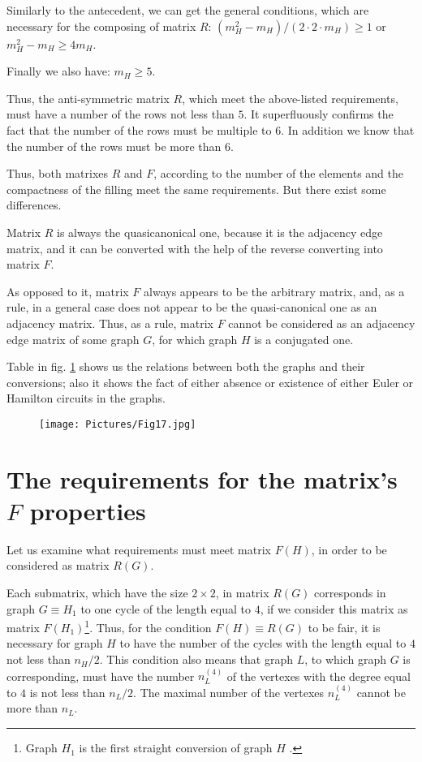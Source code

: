 \documentclass{amsart}
\theoremstyle{plain}
\numberwithin{equation}{section}
\begin{document}
Similarly to the antecedent, we can get the general conditions, which are necessary for the composing of matrix $R$: $(m_H^2-m_H)/(2\cdot 2\cdot m_H )\ge 1$ or $m_H^2-m_H\ge 4 m_H$.

Finally we also have: $m_H\ge 5$.

Thus, the anti-symmetric matrix $R$, which meet the above-listed requirements, must have a number of the rows not less than $5$. It superfluously confirms the fact that the number of the rows must be multiple to $6$. In addition we know that the number of the rows must be more than $6$.

Thus, both matrixes $R$ and $F$, according to the number of the elements and the compactness of the filling meet the same requirements. But there exist some differences.
 
Matrix $R$ is always the quasicanonical one, because it is the adjacency edge matrix, and it can be converted with the help of the reverse converting  \cite {Malinin} into matrix $F$.

As opposed to it, matrix $F$ always appears to be the arbitrary matrix, and, as a rule, in a general case does not appear to be the quasi-canonical one as an adjacency matrix. Thus, as a rule, matrix $F$ cannot be considered as an adjacency edge matrix of some graph $G$, for which graph $H$ is a conjugated one.

Table in fig. \ref{Fig:17} shows us the relations between both the graphs and their conversions; also it shows the fact of either absence or existence of either Euler or Hamilton circuits in the graphs. 

\begin{figure}[htb]
		\texttt{[image: Pictures/Fig17.jpg]}
	\caption{}
	\label{Fig:17}
\end{figure}

\section {The requirements for the matrix's $F$ properties}

Let us examine what requirements must meet matrix $F(H)$, in order to be considered as matrix $R(G)$.

Each submatrix, which have the size $2\times2$, in matrix $R(G)$ corresponds in graph $G \equiv H_1$ to one cycle of the length equal to $4$, if we consider this matrix as matrix $F(H_1)$\footnote{Graph $H_1$ is the first straight conversion of graph $H$ \cite{Malinin}.}. Thus, for the condition $F(H)\equiv R(G)$ to be fair, it is necessary for graph $H$ to have the number of the cycles with the length equal to $4$ not less than $n_H/2$. This condition also means that graph $L$, to which graph $G$ is corresponding, must have the number $n_L^{(4)}$ of the vertexes with the degree equal to $4$ is not less than $n_L/2$. The maximal number of the vertexes $n_L^{(4)}$ cannot be more than $n_L$. 
\end{document}
